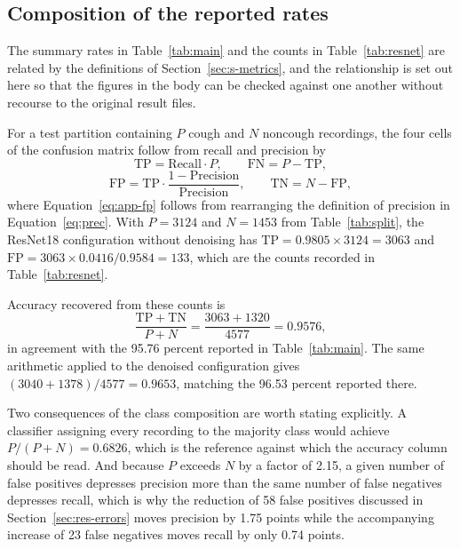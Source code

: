 \begin{appendices}

\section{Composition of the reported rates}\label{app:derivation}

The summary rates in Table~\ref{tab:main} and the counts in
Table~\ref{tab:resnet} are related by the definitions of
Section~\ref{sec:s-metrics}, and the relationship is set out here so that the
figures in the body can be checked against one another without recourse to the
original result files.

For a test partition containing $P$ cough and $N$ noncough recordings, the
four cells of the confusion matrix follow from recall and precision by
\begin{equation}
\mathrm{TP} = \mathrm{Recall} \cdot P, \qquad
\mathrm{FN} = P - \mathrm{TP},
\label{eq:app-tp}
\end{equation}
\begin{equation}
\mathrm{FP} = \mathrm{TP} \cdot
\frac{1 - \mathrm{Precision}}{\mathrm{Precision}}, \qquad
\mathrm{TN} = N - \mathrm{FP},
\label{eq:app-fp}
\end{equation}
where Equation~\eqref{eq:app-fp} follows from rearranging the definition of
precision in Equation~\eqref{eq:prec}. With $P = 3124$ and $N = 1453$ from
Table~\ref{tab:split}, the ResNet18 configuration without denoising has
$\mathrm{TP} = 0.9805 \times 3124 = 3063$ and
$\mathrm{FP} = 3063 \times 0.0416 / 0.9584 = 133$, which are the counts
recorded in Table~\ref{tab:resnet}.

Accuracy recovered from these counts is
\begin{equation}
\frac{\mathrm{TP} + \mathrm{TN}}{P + N}
= \frac{3063 + 1320}{4577} = 0.9576,
\label{eq:app-acc}
\end{equation}
in agreement with the 95.76 percent reported in Table~\ref{tab:main}. The
same arithmetic applied to the denoised configuration gives
$(3040 + 1378)/4577 = 0.9653$, matching the 96.53 percent reported there.

Two consequences of the class composition are worth stating explicitly. A
classifier assigning every recording to the majority class would achieve
$P/(P+N) = 0.6826$, which is the reference against which the accuracy column
should be read. And because $P$ exceeds $N$ by a factor of 2.15, a given
number of false positives depresses precision more than the same number of
false negatives depresses recall, which is why the reduction of 58 false
positives discussed in Section~\ref{sec:res-errors} moves precision by 1.75
points while the accompanying increase of 23 false negatives moves recall by
only 0.74 points.

\end{appendices}

